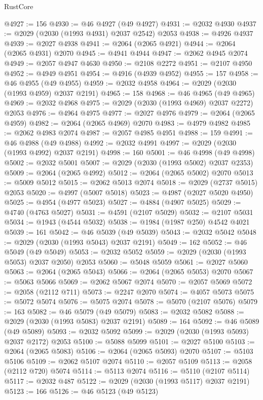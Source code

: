 \begin{lexlean}{RustCore}
\begin{coremodule}
@4927 := 156
@4930 := @46 @4927 (@49 @4927)
@4931 := @2032 @4930
@4937 := @2029 (@2030 (@1993 @4931) @2037 @2542) @2053
@4938 := @4926 @4937
@4939 := @2027 @4938
@4941 := @2064 (@2065 @4921)
@4944 := @2064 (@2065 @4931) @2070
@4945 := @4941 @4944
@4947 := @2062 @4945 @2074
@4949 := @2057 @4947 @4630
@4950 := @2108 @2272
@4951 := @2107 @4950
@4952 := @4949 @4951
@4954 := @4916 (@4939 @4952)
@4955 := 157
@4958 := @46 @4955 (@49 @4955)
@4959 := @2032 @4958
@4964 := @2029 (@2030 (@1993 @4959) @2037 @2191)
@4965 := 158
@4968 := @46 @4965 (@49 @4965)
@4969 := @2032 @4968
@4975 := @2029 (@2030 (@1993 @4969) @2037 @2272) @2053
@4976 := @4964 @4975
@4977 := @2027 @4976
@4979 := @2064 (@2065 @4959)
@4982 := @2064 (@2065 @4969) @2070
@4983 := @4979 @4982
@4985 := @2062 @4983 @2074
@4987 := @2057 @4985 @4951
@4988 := 159
@4991 := @46 @4988 (@49 @4988)
@4992 := @2032 @4991
@4997 := @2029 (@2030 (@1993 @4992) @2037 @2191)
@4998 := 160
@5001 := @46 @4998 (@49 @4998)
@5002 := @2032 @5001
@5007 := @2029 (@2030 (@1993 @5002) @2037 @2353)
@5009 := @2064 (@2065 @4992)
@5012 := @2064 (@2065 @5002) @2070
@5013 := @5009 @5012
@5015 := @2062 @5013 @2074
@5018 := @2029 (@2737 @5015) @2053
@5020 := @4997 (@5007 @5018)
@5023 := @4987 (@2027 @5020 @4950)
@5025 := @4954 (@4977 @5023)
@5027 := @4884 (@4907 @5025)
@5029 := @4740 (@4763 @5027)
@5031 := @4591 (@2107 @5029)
@5032 := @2107 @5031
@5034 := @1943 (@4544 @5032)
@5038 := @1984 (@1987 @250) @4542 @4021
@5039 := 161
@5042 := @46 @5039 (@49 @5039)
@5043 := @2032 @5042
@5048 := @2029 (@2030 (@1993 @5043) @2037 @2191)
@5049 := 162
@5052 := @46 @5049 (@49 @5049)
@5053 := @2032 @5052
@5059 := @2029 (@2030 (@1993 @5053) @2037 @2050) @2053
@5060 := @5048 @5059
@5061 := @2027 @5060
@5063 := @2064 (@2065 @5043)
@5066 := @2064 (@2065 @5053) @2070
@5067 := @5063 @5066
@5069 := @2062 @5067 @2074
@5070 := @2057 @5069
@5072 := @2058 (@2112 @711)
@5073 := @2247 @2070
@5074 := @4057 @5073
@5075 := @5072 @5074
@5076 := @5075 @2074
@5078 := @5070 (@2107 @5076)
@5079 := 163
@5082 := @46 @5079 (@49 @5079)
@5083 := @2032 @5082
@5088 := @2029 (@2030 (@1993 @5083) @2037 @2191)
@5089 := 164
@5092 := @46 @5089 (@49 @5089)
@5093 := @2032 @5092
@5099 := @2029 (@2030 (@1993 @5093) @2037 @2172) @2053
@5100 := @5088 @5099
@5101 := @2027 @5100
@5103 := @2064 (@2065 @5083)
@5106 := @2064 (@2065 @5093) @2070
@5107 := @5103 @5106
@5109 := @2062 @5107 @2074
@5110 := @2057 @5109
@5113 := @2058 (@2112 @720) @5074
@5114 := @5113 @2074
@5116 := @5110 (@2107 @5114)
@5117 := @2032 @487
@5122 := @2029 (@2030 (@1993 @5117) @2037 @2191)
@5123 := 166
@5126 := @46 @5123 (@49 @5123)

\end{coremodule}
\end{lexlean}
